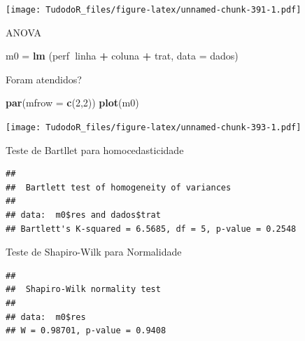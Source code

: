 \documentclass[
]{book}
\newenvironment{Shaded}{\begin{snugshade}}{\end{snugshade}}
\newcommand{\DataTypeTok}[1]{\textcolor[rgb]{0.13,0.29,0.53}{#1}}
\newcommand{\DecValTok}[1]{\textcolor[rgb]{0.00,0.00,0.81}{#1}}
\newcommand{\KeywordTok}[1]{\textcolor[rgb]{0.13,0.29,0.53}{\textbf{#1}}}
\newcommand{\NormalTok}[1]{#1}
\newcommand{\OperatorTok}[1]{\textcolor[rgb]{0.81,0.36,0.00}{\textbf{#1}}}
\newcommand{\StringTok}[1]{\textcolor[rgb]{0.31,0.60,0.02}{#1}}
\begin{document}
\texttt{[image: TudodoR\_files/figure-latex/unnamed-chunk-391-1.pdf]}

ANOVA

\begin{Shaded}
\begin{Highlighting}[]
\NormalTok{m0 =}\StringTok{ }\KeywordTok{lm}\NormalTok{ (perf}\OperatorTok{~}\NormalTok{linha }\OperatorTok{+}\StringTok{ }\NormalTok{coluna }\OperatorTok{+}\StringTok{ }\NormalTok{trat, }\DataTypeTok{data =}\NormalTok{ dados)}
\end{Highlighting}
\end{Shaded}

Foram atendidos?

\begin{Shaded}
\begin{Highlighting}[]
\KeywordTok{par}\NormalTok{(}\DataTypeTok{mfrow =} \KeywordTok{c}\NormalTok{(}\DecValTok{2}\NormalTok{,}\DecValTok{2}\NormalTok{)) }
\KeywordTok{plot}\NormalTok{(m0)}
\end{Highlighting}
\end{Shaded}

\texttt{[image: TudodoR\_files/figure-latex/unnamed-chunk-393-1.pdf]}

Teste de Bartllet para homocedasticidade

\begin{Shaded}
\end{Shaded}

\begin{verbatim}
## 
##  Bartlett test of homogeneity of variances
## 
## data:  m0$res and dados$trat
## Bartlett's K-squared = 6.5685, df = 5, p-value = 0.2548
\end{verbatim}

Teste de Shapiro-Wilk para Normalidade

\begin{Shaded}
\end{Shaded}

\begin{verbatim}
## 
##  Shapiro-Wilk normality test
## 
## data:  m0$res
## W = 0.98701, p-value = 0.9408
\end{verbatim}
\end{document}
